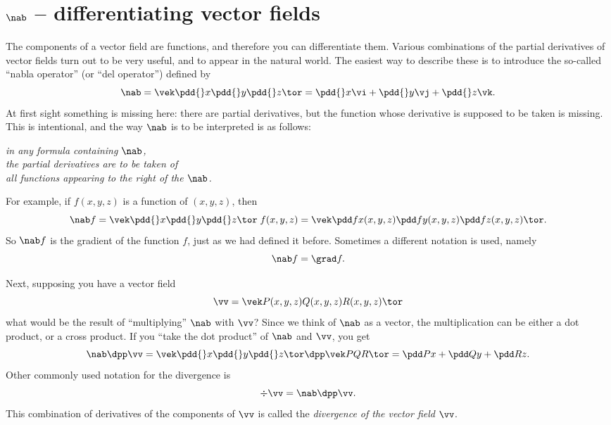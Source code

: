 \section{$\nab$ -- differentiating vector fields}  
\label{sec:nabla}
The components of a vector field are functions, and therefore you can
differentiate them.   Various combinations of the partial derivatives of
vector fields turn out to be very useful, and to appear in the natural
world.   The easiest way to describe these is to introduce the so-called
``nabla operator'' (or ``del operator'') defined by
\begin{equation}
  \nab =  \vek \pdd{}x\\[2pt] \pdd{}y \\[2pt] \pdd{}z\tor =
  \pdd{}x\vi +  \pdd{}y \vj + \pdd{}z \vk.
\end{equation}
At first sight something is missing here: there are partial derivatives,
but the function whose derivative is supposed to be taken is missing.   This
is intentional, and the way $\nab$ is to be interpreted is as follows:
\begin{center}
  \itshape
  in any formula containing $\nab$,\\
  the partial derivatives are to be taken of\\
  all functions appearing to the \emph{right} of the $\nab$.
\end{center}
For example, if $f(x, y, z)$ is a function of $(x,y,z)$, then
\[
\nab f
=\vek \pdd{}x\\[2pt] \pdd{}y \\[2pt] \pdd{}z\tor\;f(x, y, z)
=\vek\pdd fx(x, y, z) \\[2pt]\pdd fy(x, y, z) \\[2pt] \pdd fz(x, y, z)\tor.
\]
So $\nab f$ is the gradient of the function $f$, just as we had defined it
before.   Sometimes a different notation is used, namely
\[
\nab f = \grad f.
\]

Next, supposing you have a vector field
\[
\vv = \vek P(x, y, z)\\Q(x, y, z)\\R(x, y, z) \tor
\]
what would be the result of ``multiplying'' $\nab$ with $\vv$?  Since we
think of $\nab$ as a vector, the multiplication can be either a dot
product, or a cross product.   If you ``take the dot product'' of $\nab$ and
$\vv$, you get
\[
\nab \dpp \vv
= \vek \pdd{}x\\[2pt] \pdd{}y \\[2pt] \pdd{}z\tor
 \dpp \vek P \\ Q \\ R\tor
= \pdd Px + \pdd Qy + \pdd Rz.
\]
Other commonly used notation for the divergence is
\[
\div \vv  = \nab\dpp\vv.
\]
This combination of derivatives of the components of $\vv$ is called the
\emph{divergence of the vector field} $\vv$.

